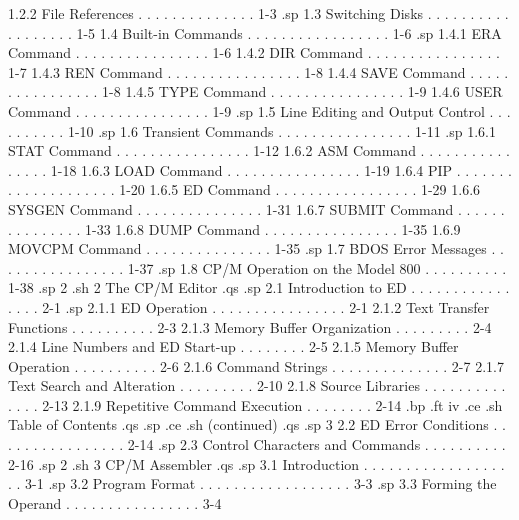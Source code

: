         1.2.2  File References  . . . . . . . . . . . . . .   1-3
.sp
   1.3  Switching Disks . . . . . . . . . . . . . . . . . .   1-5
   1.4  Built-in Commands . . . . . . . . . . . . . . . . .   1-6
.sp
        1.4.1  ERA Command  . . . . . . . . . . . . . . . .   1-6
        1.4.2  DIR Command  . . . . . . . . . . . . . . . .   1-7
        1.4.3  REN Command  . . . . . . . . . . . . . . . .   1-8
        1.4.4  SAVE Command . . . . . . . . . . . . . . . .   1-8
        1.4.5  TYPE Command . . . . . . . . . . . . . . . .   1-9
        1.4.6  USER Command . . . . . . . . . . . . . . . .   1-9
.sp
   1.5  Line Editing and Output Control . . . . . . . . . .  1-10
.sp
   1.6  Transient Commands  . . . . . . . . . . . . . . . .  1-11
.sp
        1.6.1  STAT Command . . . . . . . . . . . . . . . .  1-12
        1.6.2  ASM Command  . . . . . . . . . . . . . . . .  1-18
        1.6.3  LOAD Command . . . . . . . . . . . . . . . .  1-19
        1.6.4  PIP  . . . . . . . . . . . . . . . . . . . .  1-20
        1.6.5  ED Command . . . . . . . . . . . . . . . . .  1-29
        1.6.6  SYSGEN Command . . . . . . . . . . . . . . .  1-31
        1.6.7  SUBMIT Command . . . . . . . . . . . . . . .  1-33
        1.6.8  DUMP Command . . . . . . . . . . . . . . . .  1-35
        1.6.9  MOVCPM Command . . . . . . . . . . . . . . .  1-35
.sp
   1.7  BDOS Error Messages . . . . . . . . . . . . . . . .  1-37
.sp
   1.8  CP/M Operation on the Model 800 . . . . . . . . . .  1-38
.sp 2
.sh
2  The CP/M Editor
.qs
.sp
   2.1  Introduction to ED  . . . . . . . . . . . . . . . .   2-1
.sp
        2.1.1  ED Operation . . . . . . . . . . . . . . . .   2-1
        2.1.2  Text Transfer Functions  . . . . . . . . . .   2-3
        2.1.3  Memory Buffer Organization . . . . . . . . .   2-4
        2.1.4  Line Numbers and ED Start-up . . . . . . . .   2-5
        2.1.5  Memory Buffer Operation  . . . . . . . . . .   2-6
        2.1.6  Command Strings  . . . . . . . . . . . . . .   2-7
        2.1.7  Text Search and Alteration . . . . . . . . .  2-10
        2.1.8  Source Libraries . . . . . . . . . . . . . .  2-13
        2.1.9  Repetitive Command Execution . . . . . . . .  2-14
.bp
.ft                                iv
.ce
.sh
Table of Contents
.qs
.sp
.ce
.sh
(continued)
.qs
.sp 3
   2.2  ED Error Conditions . . . . . . . . . . . . . . . .  2-14
.sp
   2.3  Control Characters and Commands . . . . . . . . . .  2-16
.sp 2
.sh
3  CP/M Assembler
.qs
.sp
   3.1  Introduction  . . . . . . . . . . . . . . . . . . .   3-1
.sp
   3.2  Program Format  . . . . . . . . . . . . . . . . . .   3-3
.sp
   3.3  Forming the Operand . . . . . . . . . . . . . . . .   3-4
